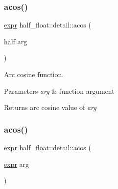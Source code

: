 \mbox{\label{namespacehalf__float_1_1detail_a12f68bb5d9a3e88d46af47071ef4e259}} 
\subsubsection{\texorpdfstring{acos()}{acos()}\hspace{0.1cm}{\footnotesize\ttfamily [1/2]}}
{\footnotesize\ttfamily \hyperlink{structhalf__float_1_1detail_1_1expr}{expr} half\+\_\+float\+::detail\+::acos (\begin{DoxyParamCaption}\item[{\hyperlink{classhalf__float_1_1half}{half}}]{arg }\end{DoxyParamCaption})\hspace{0.3cm}{\ttfamily [inline]}}

Arc cosine function. 
\begin{DoxyParams}{Parameters}
{\em arg} & function argument \\
\hline
\end{DoxyParams}
\begin{DoxyReturn}{Returns}
arc cosine value of {\itshape arg} 
\end{DoxyReturn}
\mbox{\label{namespacehalf__float_1_1detail_a3633af9d8cf722fe454f83784cb5cf90}} 
\subsubsection{\texorpdfstring{acos()}{acos()}\hspace{0.1cm}{\footnotesize\ttfamily [2/2]}}
{\footnotesize\ttfamily \hyperlink{structhalf__float_1_1detail_1_1expr}{expr} half\+\_\+float\+::detail\+::acos (\begin{DoxyParamCaption}\item[{\hyperlink{structhalf__float_1_1detail_1_1expr}{expr}}]{arg }\end{DoxyParamCaption})\hspace{0.3cm}{\ttfamily [inline]}}

\mbox{\label{namespacehalf__float_1_1detail_ab449a1df5e728eea9892dec37c3d17b3}} 
